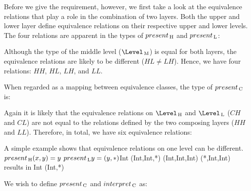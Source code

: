 Before we give the requirement, however, we first take a look at the equivalence relations that play a role in the combination of two layers. Both the upper and lower layer 
define equivalence relations on their respective upper and lower levels. The four relations are apparent in the types of $present_{\, \mathrm H}$ and $present_{\, \mathrm L}$:


Although the type of the middle level ($\Level\M$) is equal for both layers, the equivalence relations are likely to be different ($HL \neq LH$). Hence, we have four relations: $HH$, $HL$, $LH$, and $LL$.

When regarded as a mapping between equivalence classes, the type of $present_{\, \mathrm C}$ is:


Again it is likely that the equivalence relations on $\Level\H$ and $\Level\L$ ($CH$ and $CL$) are not equal to the relations defined by the two composing layers ($HH$ and $LL$). Therefore, in total, we have six equivalence relations:


\toHere
A simple example shows that equivalence relations on one level can be different. $present_{\, \mathrm H} (x,y) = y$ $present_{\, \mathrm L} y = (y,*)$Int \rarr (Int,Int,*) (Int,Int,Int) (*,Int,Int)   results in Int \rarr (Int,*)
\fromHere

We wish to define $present_{\, \mathrm C}$ and $interpret_{\, \mathrm C}$ as:


